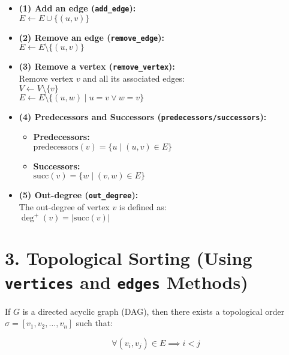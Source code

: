 \documentclass{article}
\begin{document}
\begin{itemize}
    \item \textbf{(1) Add an edge (\texttt{add\_edge}):} \\
    $E \leftarrow E \cup \{(u, v)\}$

    \item \textbf{(2) Remove an edge (\texttt{remove\_edge}):} \\
    $E \leftarrow E \setminus \{(u, v)\}$

    \item \textbf{(3) Remove a vertex (\texttt{remove\_vertex}):} \\
    Remove vertex $v$ and all its associated edges: \\
    $V \leftarrow V \setminus \{v\}$ \\
    $E \leftarrow E \setminus \{(u, w) \mid u = v \lor w = v\}$
\end{itemize}
\begin{itemize}
    \setcounter{enumi}{3}
    
    \item \textbf{(4) Predecessors and Successors (\texttt{predecessors/successors}):}
    \begin{itemize}
        \item \textbf{Predecessors:} \\
        $\text{predecessors}(v) = \{ u \mid (u, v) \in E \}$
        
        \item \textbf{Successors:} \\
        $\text{succ}(v) = \{ w \mid (v, w) \in E \}$
    \end{itemize}
    
    \item \textbf{(5) Out-degree (\texttt{out\_degree}):} \\
    The out-degree of vertex $v$ is defined as: \\
    $\deg^+(v) = |\text{succ}(v)|$
\end{itemize}
\section*{3. Topological Sorting (Using \texttt{vertices} and \texttt{edges} Methods)}

If $G$ is a directed acyclic graph (DAG), then there exists a topological order 
$\sigma = [v_1, v_2, \dots, v_n]$ such that:

\[
\forall (v_i, v_j) \in E \implies i < j
\]
\end{document}
